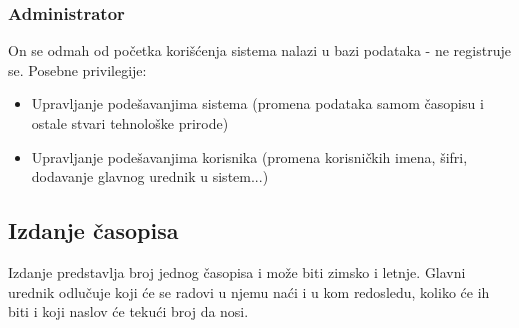 \documentclass[a4paper]{article}
\begin{document}
    \subsubsection{Administrator}
    \label{subsubsection:administrator}
    On se odmah od početka korišćenja sistema nalazi u bazi podataka - ne registruje se.
    Posebne privilegije:
    \begin{itemize}
        \item Upravljanje podešavanjima sistema (promena podataka samom časopisu i ostale stvari tehnološke prirode)
        \item Upravljanje podešavanjima korisnika (promena korisničkih imena, šifri, dodavanje glavnog urednik u sistem...)
    \end{itemize}
    
\subsection{Izdanje časopisa}
\label{section:izdanjecasopisa}
Izdanje predstavlja broj jednog časopisa i može biti zimsko i letnje. Glavni urednik odlučuje koji će se radovi u njemu naći i u kom redosledu, koliko će ih biti i koji naslov će tekući broj da nosi.
\end{document}
